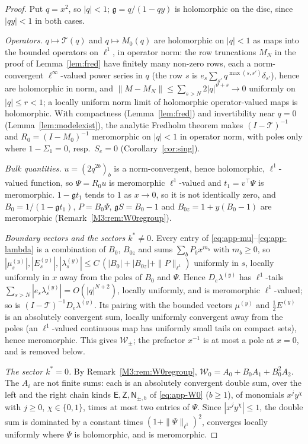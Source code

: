 \documentclass[11pt]{article}
\theoremstyle{plain}
\theoremstyle{definition}
\theoremstyle{remark}
\begin{document}
\begin{proof}
Put $q=x^2$, so $|q|<1$; $\mathfrak g=q/(1-qy)$ is holomorphic on the disc, since $|qy|<1$ in both
cases.

\emph{Operators.} $q\mapsto\mathcal T(q)$ and $q\mapsto M_0(q)$ are holomorphic on $|q|<1$ as maps
into the bounded operators on $\ell^1$, in operator norm: the row truncations $M_N$ in the proof of
Lemma~\ref{lem:fred} have finitely many non-zero rows, each a norm-convergent $\ell^\infty$-valued
power series in $q$ (the row $s$ is $e_s\sum_{s'}q^{\max(s,s')}\delta_{s'}$), hence are
holomorphic in norm, and $\|M-M_N\|\le\sum_{s>N}2|q|^{\vartheta+s}\to0$ uniformly on $|q|\le r<1$; a locally
uniform norm limit of holomorphic operator-valued maps is holomorphic. With compactness
(Lemma~\ref{lem:fred}) and invertibility near $q=0$ (Lemma~\ref{lem:modelexist}), the analytic
Fredholm theorem makes $(I-\mathcal T)^{-1}$ and $R_0=(I-M_0)^{-1}$ meromorphic on $|q|<1$ in
operator norm, with poles only where $1-\Sigma_1=0$, resp.\ $S_e=0$ (Corollary~\ref{cor:sing}).

\emph{Bulk quantities.} $u=(2q^{2b})_b$ is a norm-convergent, hence holomorphic, $\ell^1$-valued
function, so $\Psi=R_0u$ is meromorphic $\ell^1$-valued and $t_1=v^{\!\top}\Psi$ is meromorphic.
$1-\mathfrak gt_1$ tends to $1$ as $x\to0$, so it is not identically zero, and $B_0=1/(1-\mathfrak
gt_1)$, $P=B_0\Psi$, $\mathfrak gS=B_0-1$ and $B_{0z}=1+y(B_0-1)$ are meromorphic
(Remark~\ref{M3:rem:W0regroup}).

\emph{Boundary vectors and the sectors $k^\ast\ne0$.} Every entry of
\eqref{eq:app-mu}--\eqref{eq:app-lambda} is a combination of $B_0$, $B_{0z}$ and sums
$\sum_bP_bx^{m_b}$ with $m_b\ge0$, so $|\mu^{(y)}_s|,|E^{(y)}_s|,|\lambda^{(y)}_s|\le
C\,(|B_0|+|B_{0z}|+\|P\|_{\ell^1})$ uniformly in $s$, locally uniformly in $x$ away from the poles
of $B_0$ and $\Psi$. Hence $D_e\lambda^{(y)}$ has $\ell^1$-tails
$\sum_{s>N}|e_s\lambda^{(y)}_s|=O(|q|^{N+2})$, locally uniformly, and is meromorphic
$\ell^1$-valued; so is $(I-\mathcal T)^{-1}D_e\lambda^{(y)}$. Its pairing with the bounded vectors
$\mu^{(y)}$ and $\tfrac12E^{(y)}$ is an absolutely convergent sum, locally uniformly convergent
away from the poles (an $\ell^1$-valued continuous map has uniformly small tails on compact sets),
hence meromorphic. This gives $\mathcal W_\pm$; the prefactor $x^{-1}$ is at most a pole at $x=0$,
and is removed below.

\emph{The sector $k^\ast=0$.} By Remark~\ref{M3:rem:W0regroup},
$\mathcal W_0=A_0+B_0A_1+B_0^2A_2$. The $A_i$ are not finite sums: each is an absolutely convergent
double sum, over the left and the right chain kinds $\mathsf E,\mathsf Z,\mathsf N_{\pm,b}$ of
\eqref{eq:app-W0} ($b\ge1$), of monomials $x^jy^\chi$ with $j\ge0$, $\chi\in\{0,1\}$, times at most
two entries of $\Psi$. Since $|x^jy^\chi|\le1$, the double sum is dominated by a constant times
$(1+\|\Psi\|_{\ell^1})^2$, converges locally uniformly where $\Psi$ is holomorphic, and is
meromorphic.


\end{proof}
\end{document}
